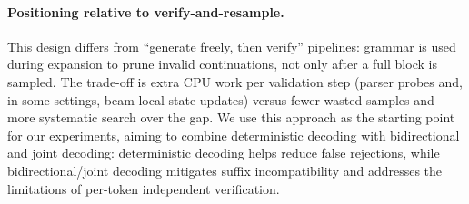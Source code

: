 \paragraph{Positioning relative to verify-and-resample.}
This design differs from ``generate freely, then verify'' pipelines: grammar is used during expansion to prune invalid continuations, not only after a full block is sampled. The trade-off is extra CPU work per validation step (parser probes and, in some settings, beam-local state updates) versus fewer wasted samples and more systematic search over the gap. We use this approach as the starting point for our experiments, aiming to combine deterministic decoding with bidirectional and joint decoding: deterministic decoding helps reduce false rejections, while bidirectional/joint decoding mitigates suffix incompatibility and addresses the limitations of per-token independent verification.




    
    


